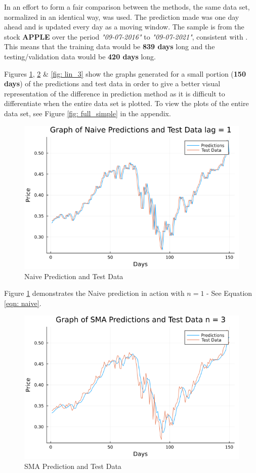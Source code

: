 In an effort to form a fair comparison between the methods, the same data set, normalized in an identical way, was used. The prediction made was one day ahead and is updated every day as a moving window. The sample is from the stock \textbf{APPLE} over the period \textit{"09-07-2016"} to \textit{"09-07-2021"}, consistent with \cite{ml_paper}. This means that the training data would be \textbf{839 days} long and the testing/validation data would be \textbf{420 days} long.

\noindent Figures \ref{fig: lag_1}, \ref{fig: sma_3} \& \ref{fig: lin_3} show the graphs generated for 
a small portion (\textbf{150 days}) of the predictions and test data  in order to give a better visual representation of the difference in prediction method as it is difficult to differentiate when the entire data set is plotted. To view the plots of the entire data set, see Figure \ref{fig: full_simple} in the appendix.

\begin{figure}[h]
    \centering
    \includegraphics[width=0.8\columnwidth]{Results/lag_1.png}
    \caption{Naive Prediction and Test Data}
    \label{fig: lag_1}
\end{figure}

\noindent Figure \ref{fig: lag_1} demonstrates the Naive prediction in action with $n = 1$ - See Equation \ref{eqn: naive}.

\begin{figure}[h]
    \centering
    \includegraphics[width=0.8\columnwidth]{Results/sma_3.png}
    \caption{SMA Prediction and Test Data}
    \label{fig: sma_3}
\end{figure}

